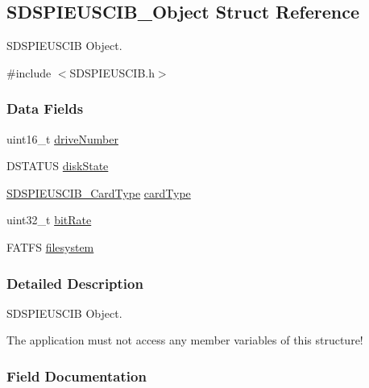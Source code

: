 \subsection{S\+D\+S\+P\+I\+E\+U\+S\+C\+I\+B\+\_\+\+Object Struct Reference}
\label{struct_s_d_s_p_i_e_u_s_c_i_b___object}


S\+D\+S\+P\+I\+E\+U\+S\+C\+I\+B Object.  




{\ttfamily \#include $<$S\+D\+S\+P\+I\+E\+U\+S\+C\+I\+B.\+h$>$}

\subsubsection*{Data Fields}
\begin{DoxyCompactItemize}
\item 
uint16\+\_\+t \hyperlink{struct_s_d_s_p_i_e_u_s_c_i_b___object_a8130564eeb4c4fec78f98bc8de83cd00}{drive\+Number}
\item 
D\+S\+T\+A\+T\+U\+S \hyperlink{struct_s_d_s_p_i_e_u_s_c_i_b___object_acf52e179c29f0bd89168035ef525a266}{disk\+State}
\item 
\hyperlink{_s_d_s_p_i_e_u_s_c_i_b_8h_a4fa2b3bc20d44e2e53e621d22a3d77a3}{S\+D\+S\+P\+I\+E\+U\+S\+C\+I\+B\+\_\+\+Card\+Type} \hyperlink{struct_s_d_s_p_i_e_u_s_c_i_b___object_a3e9f9d8f1abb3212dc562f1660425a05}{card\+Type}
\item 
uint32\+\_\+t \hyperlink{struct_s_d_s_p_i_e_u_s_c_i_b___object_ae13e937c65dad9e121a5308fd3eeb44a}{bit\+Rate}
\item 
F\+A\+T\+F\+S \hyperlink{struct_s_d_s_p_i_e_u_s_c_i_b___object_ab6b0744727dfe999c9e73177cb81509e}{filesystem}
\end{DoxyCompactItemize}


\subsubsection{Detailed Description}
S\+D\+S\+P\+I\+E\+U\+S\+C\+I\+B Object. 

The application must not access any member variables of this structure! 

\subsubsection{Field Documentation}
